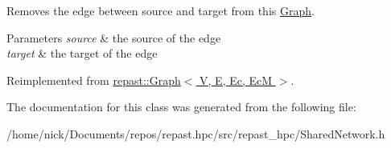Removes the edge between source and target from this \hyperlink{classrepast_1_1_graph}{Graph}. 


\begin{DoxyParams}{Parameters}
{\em source} & the source of the edge \\
\hline
{\em target} & the target of the edge \\
\hline
\end{DoxyParams}


Reimplemented from \hyperlink{classrepast_1_1_graph_a95ddd223fa26a5390c13aa1c4fec9254}{repast\-::\-Graph$<$ V, E, Ec, Ec\-M $>$}.



The documentation for this class was generated from the following file\-:\begin{DoxyCompactItemize}
\item 
/home/nick/\-Documents/repos/repast.\-hpc/src/repast\-\_\-hpc/Shared\-Network.\-h\end{DoxyCompactItemize}
